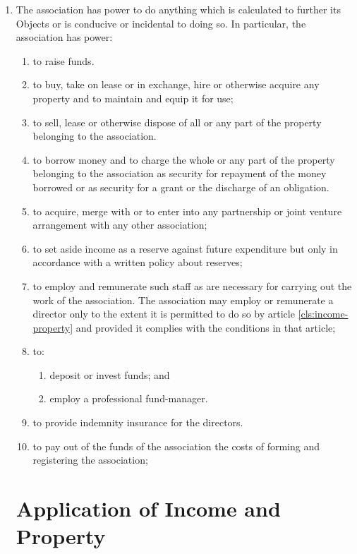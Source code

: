 \begin{enumerate}
\item
  The association has power to do anything which is calculated to further
  its Objects or is conducive or incidental to doing so. In
  particular, the association has power:
  \begin{enumerate}
  \item
    to raise funds.
  \item
    to buy, take on lease or in exchange, hire or otherwise acquire any
    property and to maintain and equip it for use;
  \item
    to sell, lease or otherwise dispose of all or any part of the
    property belonging to the association.
  \item
    to borrow money and to charge the whole or any part of the property
    belonging to the association as security for repayment of the money
    borrowed or as security for a grant or the discharge of an
    obligation.
  \item
    to acquire, merge with or to enter into any partnership or joint
    venture arrangement with any other association;
  \item
    to set aside income as a reserve against future expenditure but
    only in accordance with a written policy about reserves;
  \item
    to employ and remunerate such staff as are necessary for carrying
    out the work of the association. The association may employ or remunerate a
    director only to the extent it is permitted to do so by article \ref{cls:income-property}
    and provided it complies with the conditions in that article;
  \item
    to:
    \begin{enumerate}
    \item
      deposit or invest funds; and
    \item
      employ a professional fund-manager.
    \end{enumerate}
  \item
    to provide indemnity insurance for the directors.
  \item
    to pay out of the funds of the association the costs of forming and
    registering the association;
  \end{enumerate}

\section{Application of Income and Property}


\end{enumerate}
